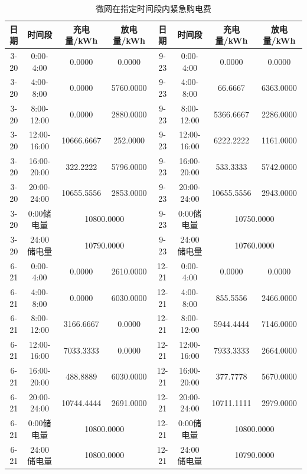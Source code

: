 \documentclass{cumcm2026}
\begin{document}
\begin{table}[H]
\centering
\caption{微网在指定时间段内紧急购电费}
\label{asdads}
\small
\setlength{\tabcolsep}{1pt}
\renewcommand{\arraystretch}{1.05}
\setlength{\extrarowheight}{0.4pt}
\setlength{\aboverulesep}{0.28ex}
\setlength{\belowrulesep}{0.24ex}
\begin{tabular}{@{}cccccccc@{}}
\toprule
\textbf{日期} & \textbf{时间段} & \textbf{充电量/kWh} & \textbf{放电量/kWh} & \textbf{日期} & \textbf{时间段} & \textbf{充电量/kWh} & \textbf{放电量/kWh} \\
\midrule
3-20 & 0:00-4:00 & 0.0000 & 0.0000 & 9-23 & 0:00-4:00 & 0.0000 & 0.0000 \\
3-20 & 4:00-8:00 & 0.0000 & 5760.0000 & 9-23 & 4:00-8:00 & 66.6667 & 6363.0000 \\
3-20 & 8:00-12:00 & 0.0000 & 2880.0000 & 9-23 & 8:00-12:00 & 5366.6667 & 2286.0000 \\
3-20 & 12:00-16:00 & 10666.6667 & 252.0000 & 9-23 & 12:00-16:00 & 6222.2222 & 1161.0000 \\
3-20 & 16:00-20:00 & 322.2222 & 5796.0000 & 9-23 & 16:00-20:00 & 533.3333 & 5742.0000 \\
3-20 & 20:00-24:00 & 10655.5556 & 2853.0000 & 9-23 & 20:00-24:00 & 10655.5556 & 2943.0000 \\
3-20 & 0:00储电量 & \multicolumn{2}{c}{10800.0000} & 9-23 & 0:00储电量 & \multicolumn{2}{c}{10750.0000} \\
3-20 & 24:00储电量 & \multicolumn{2}{c}{10790.0000} & 9-23 & 24:00储电量 & \multicolumn{2}{c}{10760.0000} \\
6-21 & 0:00-4:00 & 0.0000 & 2610.0000 & 12-21 & 0:00-4:00 & 0.0000 & 0.0000 \\
6-21 & 4:00-8:00 & 0.0000 & 6030.0000 & 12-21 & 4:00-8:00 & 855.5556 & 2466.0000 \\
6-21 & 8:00-12:00 & 3166.6667 & 0.0000 & 12-21 & 8:00-12:00 & 5944.4444 & 7146.0000 \\
6-21 & 12:00-16:00 & 7033.3333 & 0.0000 & 12-21 & 12:00-16:00 & 7933.3333 & 2664.0000 \\
6-21 & 16:00-20:00 & 488.8889 & 6030.0000 & 12-21 & 16:00-20:00 & 377.7778 & 5670.0000 \\
6-21 & 20:00-24:00 & 10744.4444 & 2691.0000 & 12-21 & 20:00-24:00 & 10711.1111 & 2979.0000 \\
6-21 & 0:00储电量 & \multicolumn{2}{c}{10800.0000} & 12-21 & 0:00储电量 & \multicolumn{2}{c}{10800.0000} \\
6-21 & 24:00储电量 & \multicolumn{2}{c}{10800.0000} & 12-21 & 24:00储电量 & \multicolumn{2}{c}{10790.0000} \\
\bottomrule
\end{tabular}
\end{table}
\end{document}
